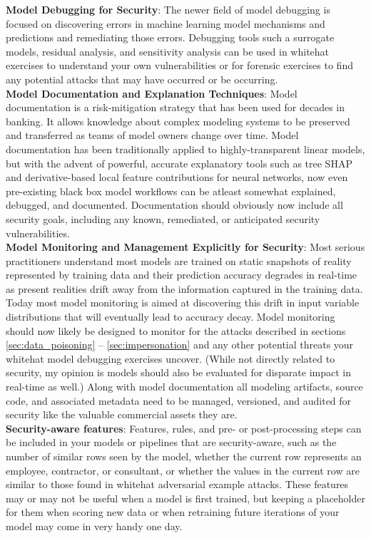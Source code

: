 \documentclass[fleqn]{article}
\begin{document}
\noindent\textbf{Model Debugging for Security}: The newer field of model debugging is focused on discovering errors in machine learning model mechanisms and predictions and remediating those errors. Debugging tools such a surrogate models, residual analysis, and sensitivity analysis can be used in whitehat exercises to understand your own vulnerabilities or for forensic exercises to find any potential attacks that may have occurred or be occurring.\\

\noindent\textbf{Model Documentation and Explanation Techniques}: Model documentation is a risk-mitigation strategy that has been used for decades in banking. It allows knowledge about complex modeling systems to be preserved and transferred as teams of model owners change over time. Model documentation has been traditionally applied to highly-transparent linear models, but with the advent of powerful, accurate explanatory tools such as tree SHAP and derivative-based local feature contributions for neural networks, now even pre-existing black box model workflows can be atleast somewhat explained, debugged, and documented. Documentation should obviously now include all security goals, including any known, remediated, or anticipated security vulnerabilities.\\

\noindent\textbf{Model Monitoring and Management Explicitly for Security}: Most serious practitioners understand most models are trained on static snapshots of reality represented by training data and their prediction accuracy degrades in real-time as present realities drift away from the information captured in the training data. Today most model monitoring is aimed at discovering this drift in input variable distributions that will eventually lead to accuracy decay. Model monitoring should now likely be designed to monitor for the attacks described in sections  \ref{sec:data_poisoning} -- \ref{sec:impersonation} and any other potential threats your whitehat model debugging exercises uncover. (While not directly related to security, my opinion is models should also be evaluated for disparate impact in real-time as well.) Along with model documentation all modeling artifacts, source code, and associated metadata need to be managed, versioned, and audited for security like the valuable commercial assets they are.\\

\noindent\textbf{Security-aware features}: Features, rules, and pre- or post-processing steps can be included in your models or pipelines that are security-aware, such as the number of similar rows seen by the model, whether the current row represents an employee, contractor, or consultant, or whether the values in the current row are similar to those found in whitehat adversarial example attacks. These features may or may not be useful when a model is first trained, but keeping a placeholder for them when scoring new data or when retraining future iterations of your model may come in very handy one day.\\
\end{document}
